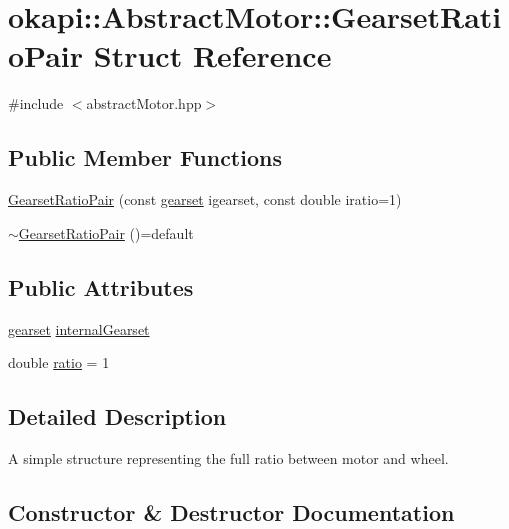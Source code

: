 \hypertarget{structokapi_1_1AbstractMotor_1_1GearsetRatioPair}{}\section{okapi\+::Abstract\+Motor\+::Gearset\+Ratio\+Pair Struct Reference}
\label{structokapi_1_1AbstractMotor_1_1GearsetRatioPair}


{\ttfamily \#include $<$abstract\+Motor.\+hpp$>$}

\subsection*{Public Member Functions}
\begin{DoxyCompactItemize}
\item 
\mbox{\hyperlink{structokapi_1_1AbstractMotor_1_1GearsetRatioPair_aac7d2a71ed59cee3eb126c834d59d69a}{Gearset\+Ratio\+Pair}} (const \mbox{\hyperlink{classokapi_1_1AbstractMotor_a88aaa6ea2fa10f5520a537bbf26774d5}{gearset}} igearset, const double iratio=1)
\item 
\mbox{\hyperlink{structokapi_1_1AbstractMotor_1_1GearsetRatioPair_a78b0163286cab14b29c8545aaf8ccd9d}{$\sim$\+Gearset\+Ratio\+Pair}} ()=default
\end{DoxyCompactItemize}
\subsection*{Public Attributes}
\begin{DoxyCompactItemize}
\item 
\mbox{\hyperlink{classokapi_1_1AbstractMotor_a88aaa6ea2fa10f5520a537bbf26774d5}{gearset}} \mbox{\hyperlink{structokapi_1_1AbstractMotor_1_1GearsetRatioPair_aa98dba092145fa1f0f2669d754e2e37d}{internal\+Gearset}}
\item 
double \mbox{\hyperlink{structokapi_1_1AbstractMotor_1_1GearsetRatioPair_a4a8e2e226cf3171194616b125ead58cb}{ratio}} = 1
\end{DoxyCompactItemize}


\subsection{Detailed Description}
A simple structure representing the full ratio between motor and wheel. 

\subsection{Constructor \& Destructor Documentation}
\mbox{\label{structokapi_1_1AbstractMotor_1_1GearsetRatioPair_aac7d2a71ed59cee3eb126c834d59d69a}} 
